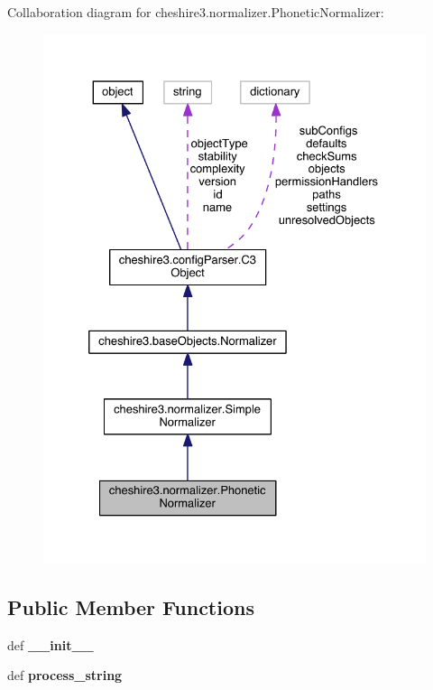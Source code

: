 Collaboration diagram for cheshire3.\-normalizer.\-Phonetic\-Normalizer\-:
\nopagebreak
\begin{figure}[H]
\begin{center}
\leavevmode
\includegraphics[width=328pt]{classcheshire3_1_1normalizer_1_1_phonetic_normalizer__coll__graph}
\end{center}
\end{figure}
\subsection*{Public Member Functions}
\begin{DoxyCompactItemize}
\item 
\hypertarget{classcheshire3_1_1normalizer_1_1_phonetic_normalizer_a67a863d5a2c5509bf9151f48dc5f3c7b}{def {\bfseries \-\_\-\-\_\-init\-\_\-\-\_\-}}\label{classcheshire3_1_1normalizer_1_1_phonetic_normalizer_a67a863d5a2c5509bf9151f48dc5f3c7b}

\item 
\hypertarget{classcheshire3_1_1normalizer_1_1_phonetic_normalizer_a8656877f5ab1d0c7a3e0f891f761e706}{def {\bfseries process\-\_\-string}}\label{classcheshire3_1_1normalizer_1_1_phonetic_normalizer_a8656877f5ab1d0c7a3e0f891f761e706}

\end{DoxyCompactItemize}
